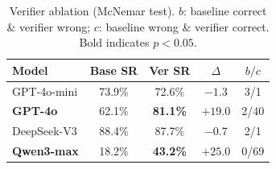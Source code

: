 \begin{table}[t]
\centering
\caption{Verifier ablation (McNemar test). $b$: baseline correct \& verifier wrong; $c$: baseline wrong \& verifier correct. Bold indicates $p < 0.05$.}
\label{tab:verifier}
\small
\begin{tabular}{@{}lcccc@{}}
\toprule
Model & Base SR & Ver SR & $\Delta$ & $b/c$ \\
\midrule
GPT-4o-mini & 73.9\% & 72.6\% & $-1.3$ & 3/1 \\
\textbf{GPT-4o} & 62.1\% & \textbf{81.1\%} & $\mathbf{+19.0}$ & 2/40 \\
DeepSeek-V3 & 88.4\% & 87.7\% & $-0.7$ & 2/1 \\
\textbf{Qwen3-max} & 18.2\% & \textbf{43.2\%} & $\mathbf{+25.0}$ & 0/69 \\
\bottomrule
\end{tabular}
\end{table}

